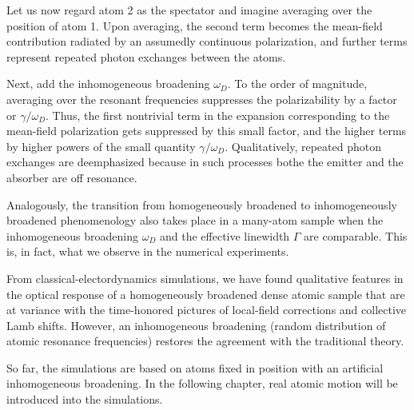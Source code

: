 Let us now regard atom 2 as the spectator and imagine averaging over the position of atom 1. Upon averaging, the second term becomes the mean-field contribution radiated by an assumedly continuous polarization, and further terms represent repeated photon exchanges between the atoms. 

Next, add the inhomogeneous broadening $\omega_D$. To the order of magnitude, averaging over the resonant frequencies suppresses the polarizability by a factor or $\gamma/\omega_D$. Thus, the first nontrivial term in the expansion corresponding to the mean-field polarization gets suppressed by this small factor, and the higher terms by higher powers of the small quantity $\gamma/\omega_D$. Qualitatively, repeated photon exchanges are deemphasized because in such processes bothe the emitter and the absorber are off resonance.

Analogously, the transition from homogeneously broadened to inhomogeneously broadened phenomenology also takes place in a many-atom sample when the inhomogeneous broadening $\omega_D$ and the effective linewidth $\Gamma$ are comparable. This is, in fact, what we observe in the numerical experiments.

From classical-electordynamics simulations, we have found qualitative features in the optical response of a homogeneously broadened dense atomic sample that are at variance with the time-honored pictures of local-field corrections and collective Lamb shifts. However, an inhomogeneous broadening (random distribution of atomic resonance frequencies) restores the agreement with the traditional theory.

So far, the simulations are based on atoms fixed in position with an artificial inhomogeneous broadening. In the following chapter, real atomic motion will be introduced into the simulations.

